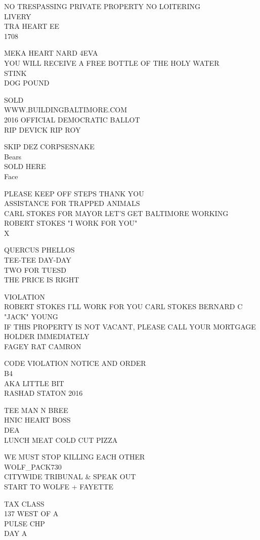 \documentclass[10pt,letterpaper]{article}
\begin{document}
NO TRESPASSING PRIVATE PROPERTY NO LOITERING\\
LIVERY\\
TRA HEART EE\\
1708

MEKA HEART NARD 4EVA\\
YOU WILL RECEIVE A FREE BOTTLE OF THE HOLY WATER\\
STINK\\
DOG POUND

SOLD\\
WWW.BUILDINGBALTIMORE.COM\\
2016 OFFICIAL DEMOCRATIC BALLOT\\
RIP DEVICK RIP ROY

SKIP DEZ CORPSESNAKE\\
Bears\\
SOLD HERE\\
Face

PLEASE KEEP OFF STEPS THANK YOU\\
ASSISTANCE FOR TRAPPED ANIMALS\\
CARL STOKES FOR MAYOR LET'S GET BALTIMORE WORKING ROBERT STOKES "I WORK FOR YOU"\\
X

QUERCUS PHELLOS\\
TEE{-}TEE DAY{-}DAY\\
TWO FOR TUESD\\
THE PRICE IS RIGHT

VIOLATION\\
ROBERT STOKES I'LL WORK FOR YOU CARL STOKES BERNARD C "JACK" YOUNG\\
IF THIS PROPERTY IS NOT VACANT, PLEASE CALL YOUR MORTGAGE HOLDER IMMEDIATELY\\
FAGEY RAT CAMRON

CODE VIOLATION NOTICE AND ORDER\\
B4\\
AKA LITTLE BIT\\
RASHAD STATON 2016

TEE MAN N BREE\\
HNIC HEART BOSS\\
DEA\\
LUNCH MEAT COLD CUT PIZZA

WE MUST STOP KILLING EACH OTHER\\
WOLF\_PACK730\\
CITYWIDE TRIBUNAL \& SPEAK OUT\\
START TO WOLFE + FAYETTE

TAX CLASS\\
137 WEST OF A\\
PULSE CHP\\
DAY A
\end{document}
